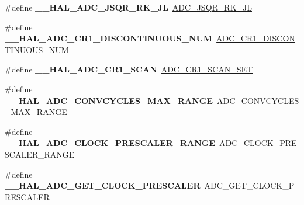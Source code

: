 \begin{DoxyCompactItemize}
\item 
\hypertarget{group___h_a_l___a_d_c___aliased___macros_ga51b8c1d68c48edfa958f988845d2ea41}{\#define {\bfseries \-\_\-\-\_\-\-H\-A\-L\-\_\-\-A\-D\-C\-\_\-\-J\-S\-Q\-R\-\_\-\-R\-K\-\_\-\-J\-L}~\hyperlink{group___a_d_c___private___macros_gaa7218626a8bbabdc160a2c5cbe6fb0ab}{A\-D\-C\-\_\-\-J\-S\-Q\-R\-\_\-\-R\-K\-\_\-\-J\-L}}\label{group___h_a_l___a_d_c___aliased___macros_ga51b8c1d68c48edfa958f988845d2ea41}

\item 
\hypertarget{group___h_a_l___a_d_c___aliased___macros_gab00342d0ece8deb8900df22b5193377e}{\#define {\bfseries \-\_\-\-\_\-\-H\-A\-L\-\_\-\-A\-D\-C\-\_\-\-C\-R1\-\_\-\-D\-I\-S\-C\-O\-N\-T\-I\-N\-U\-O\-U\-S\-\_\-\-N\-U\-M}~\hyperlink{group___a_d_c___private___macros_gaf52092c7978306ff922b2a6b42087472}{A\-D\-C\-\_\-\-C\-R1\-\_\-\-D\-I\-S\-C\-O\-N\-T\-I\-N\-U\-O\-U\-S\-\_\-\-N\-U\-M}}\label{group___h_a_l___a_d_c___aliased___macros_gab00342d0ece8deb8900df22b5193377e}

\item 
\hypertarget{group___h_a_l___a_d_c___aliased___macros_gae645d58040b162666fa506aeb3728f49}{\#define {\bfseries \-\_\-\-\_\-\-H\-A\-L\-\_\-\-A\-D\-C\-\_\-\-C\-R1\-\_\-\-S\-C\-A\-N}~\hyperlink{group___a_d_c___private___macros_ga8cd628bbd49f48a40b2de13077c7ba3d}{A\-D\-C\-\_\-\-C\-R1\-\_\-\-S\-C\-A\-N\-\_\-\-S\-E\-T}}\label{group___h_a_l___a_d_c___aliased___macros_gae645d58040b162666fa506aeb3728f49}

\item 
\hypertarget{group___h_a_l___a_d_c___aliased___macros_gaffcdf78845300c37812650611d2915b4}{\#define {\bfseries \-\_\-\-\_\-\-H\-A\-L\-\_\-\-A\-D\-C\-\_\-\-C\-O\-N\-V\-C\-Y\-C\-L\-E\-S\-\_\-\-M\-A\-X\-\_\-\-R\-A\-N\-G\-E}~\hyperlink{group___a_d_c_ex___private___macro_ga649e53d6a9a5716d9dce4d58904a3884}{A\-D\-C\-\_\-\-C\-O\-N\-V\-C\-Y\-C\-L\-E\-S\-\_\-\-M\-A\-X\-\_\-\-R\-A\-N\-G\-E}}\label{group___h_a_l___a_d_c___aliased___macros_gaffcdf78845300c37812650611d2915b4}

\item 
\hypertarget{group___h_a_l___a_d_c___aliased___macros_gad371b9c9ce847537972a0bc6c1422c45}{\#define {\bfseries \-\_\-\-\_\-\-H\-A\-L\-\_\-\-A\-D\-C\-\_\-\-C\-L\-O\-C\-K\-\_\-\-P\-R\-E\-S\-C\-A\-L\-E\-R\-\_\-\-R\-A\-N\-G\-E}~A\-D\-C\-\_\-\-C\-L\-O\-C\-K\-\_\-\-P\-R\-E\-S\-C\-A\-L\-E\-R\-\_\-\-R\-A\-N\-G\-E}\label{group___h_a_l___a_d_c___aliased___macros_gad371b9c9ce847537972a0bc6c1422c45}

\item 
\hypertarget{group___h_a_l___a_d_c___aliased___macros_ga0595fba00a50ea5ba7b8baf4cbdd6820}{\#define {\bfseries \-\_\-\-\_\-\-H\-A\-L\-\_\-\-A\-D\-C\-\_\-\-G\-E\-T\-\_\-\-C\-L\-O\-C\-K\-\_\-\-P\-R\-E\-S\-C\-A\-L\-E\-R}~A\-D\-C\-\_\-\-G\-E\-T\-\_\-\-C\-L\-O\-C\-K\-\_\-\-P\-R\-E\-S\-C\-A\-L\-E\-R}\label{group___h_a_l___a_d_c___aliased___macros_ga0595fba00a50ea5ba7b8baf4cbdd6820}


\end{DoxyCompactItemize}
